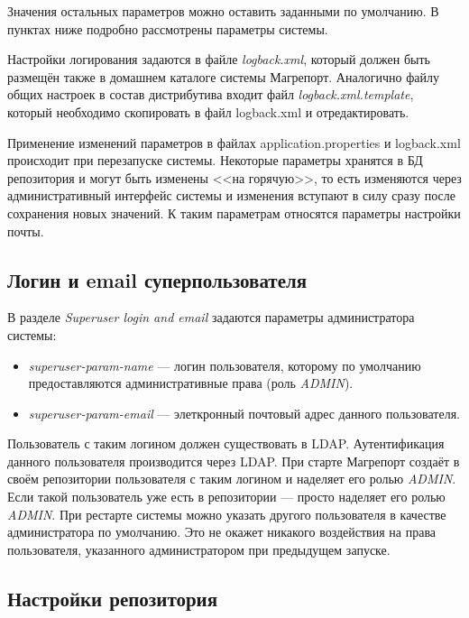 \documentclass[../user-manual.tex]{subfiles}
\begin{document}
	Значения остальных параметров можно оставить заданными по умолчанию. В пунктах ниже подробно рассмотрены параметры системы.
	
	Настройки логирования задаются в файле \textit{logback.xml}, который должен быть размещён также в домашнем каталоге системы Магрепорт. Аналогично файлу общих настроек в состав дистрибутива входит файл \textit{logback.xml.template}, который необходимо скопировать в файл logback.xml и отредактировать.
	
	Применение изменений параметров в файлах application.properties и logback.xml происходит при перезапуске системы. Некоторые параметры хранятся в БД репозитория и могут быть изменены <<на горячую>>, то есть изменяются через административный интерфейс системы и изменения вступают в силу сразу после сохранения новых значений. К таким параметрам относятся параметры настройки почты.
	
	\subsection{Логин и email суперпользователя}\label{subsection:superuser}
	
	В разделе \textit{Superuser login and email} задаются параметры администратора системы:
	
	\begin{itemize}
		\item \textit{superuser-param-name} --- логин пользователя, которому по умолчанию предоставляются административные права (роль \textit{ADMIN}).
		\item \textit{superuser-param-email} --- элеткронный почтовый адрес данного пользователя.
	\end{itemize}

	Пользователь с таким логином должен существовать в LDAP. Аутентификация данного пользователя производится через LDAP. При старте Магрепорт создаёт в своём репозитории пользователя с таким логином и наделяет его ролью \textit{ADMIN}. Если такой пользователь уже есть в репозитории --- просто наделяет его ролью \textit{ADMIN}. При рестарте системы можно указать другого пользователя в качестве администратора по умолчанию. Это не окажет никакого воздействия на права пользователя, указанного администратором при предыдущем запуске.
	
	\subsection{Настройки репозитория}\label{subsection:repository-settings}
	
\end{document}
